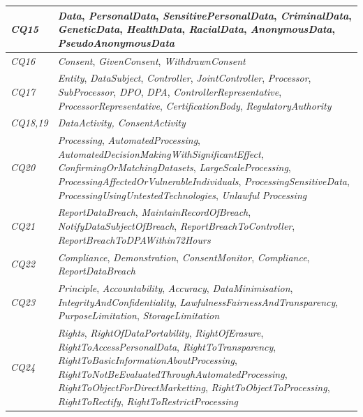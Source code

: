 \begin{center}
\begin{tabularx}{\textwidth}{|l|X|}
\textit{CQ15} & \textit{Data}, \textit{PersonalData}, \textit{SensitivePersonalData}, \textit{CriminalData}, \textit{GeneticData}, \textit{HealthData}, \textit{RacialData}, \textit{AnonymousData}, \textit{PseudoAnonymousData} \\ \hline
\textit{CQ16} & \textit{Consent}, \textit{GivenConsent}, \textit{WithdrawnConsent} \\ \hline
\textit{CQ17} & \textit{Entity}, \textit{DataSubject}, \textit{Controller}, \textit{JointController}, \textit{Processor}, \textit{SubProcessor}, \textit{DPO}, \textit{DPA}, \textit{ControllerRepresentative}, \textit{ProcessorRepresentative}, \textit{CertificationBody}, \textit{RegulatoryAuthority} \\ \hline
\textit{CQ18,19} & \textit{DataActivity, ConsentActivity} \\ \hline
\textit{CQ20} & \textit{Processing}, \textit{AutomatedProcessing}, \textit{AutomatedDecisionMakingWithSignificantEffect}, \textit{ConfirmingOrMatchingDatasets}, \textit{LargeScaleProcessing}, \textit{ProcessingAffectedOrVulnerableIndividuals}, \textit{ProcessingSensitiveData}, \textit{ProcessingUsingUntestedTechnologies}, \textit{Unlawful} \textit{Processing} \\ \hline
\textit{CQ21} & \textit{ReportDataBreach}, \textit{MaintainRecordOfBreach},  \textit{NotifyDataSubjectOfBreach}, \textit{ReportBreachToController}, \textit{ReportBreachToDPAWithin72Hours} \\ \hline
\textit{CQ22} & \textit{Compliance}, \textit{Demonstration}, \textit{ConsentMonitor}, \textit{Compliance}, \textit{ReportDataBreach}  \\ \hline
\textit{CQ23} & \textit{Principle}, \textit{Accountability}, \textit{Accuracy}, \textit{DataMinimisation}, \textit{IntegrityAndConfidentiality}, \textit{LawfulnessFairnessAndTransparency}, \textit{PurposeLimitation}, \textit{StorageLimitation}  \\ \hline
\textit{CQ24} & \textit{Rights}, \textit{RightOfDataPortability}, \textit{RightOfErasure}, \textit{RightToAccessPersonalData}, \textit{RightToTransparency}, \textit{RightToBasicInformationAboutProcessing}, \textit{RightToNotBeEvaluatedThroughAutomatedProcessing}, \textit{RightToObjectForDirectMarketting}, \textit{RightToObjectToProcessing}, \textit{RightToRectify}, \textit{RightToRestrictProcessing} \\ \hline

\end{tabularx}
\end{center}
